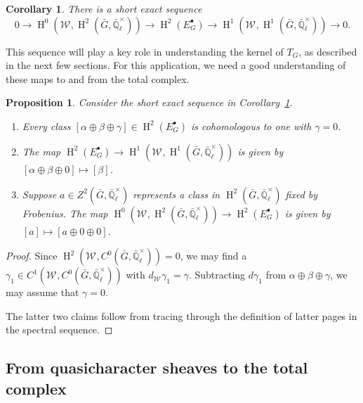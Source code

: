 \documentclass[10pt]{amsart}
\theoremstyle{plain}
\newtheorem{proposition}[theorem]{Proposition}
\newtheorem{corollary}[theorem]{Corollary}
\theoremstyle{definition}
\theoremstyle{remark}
\newcommand{\EE}{\mathbb{\bar Q}_\ell}
\newcommand{\EEx}{\EE^\times}
\newcommand{\Weil}[1]{\mathcal{W}_{#1}}
\DeclareMathOperator{\Hh}{H}
\newcommand{\TrFrob}[1]{T_{#1}}
\begin{document}
\begin{corollary}\label{cor:spectral_ses}
There is a short exact sequence
 \[
    0 \to
    \Hh^0(\Weil{},\Hh^2({\bar G},\EEx)) \to
    \Hh^2(E^\bullet_G) \to
    \Hh^1(\Weil{},\Hh^1({\bar G},\EEx)) \to
    0.
 \]
\end{corollary}

This sequence will play a key role in understanding the kernel of $\TrFrob{G}$, as described in the next few sections.
For this application, we need a good understanding of these maps to and from the total complex.

\begin{proposition} \label{prop:ses_desc}
Consider the short exact sequence in Corollary~\ref{cor:spectral_ses}.
\begin{enumerate}
\item Every class $[\alpha\oplus\beta\oplus\gamma] \in \Hh^2(E^\bullet_G)$ is cohomologous to one with $\gamma=0$.
\item The map $\Hh^2(E^\bullet_G) \to \Hh^1(\Weil{},\Hh^1({\bar G},\EEx))$ is given by $[\alpha\oplus\beta\oplus 0] \mapsto [\beta]$.
\item Suppose $a \in Z^2({\bar G}, \EEx)$ represents a class in $\Hh^2({\bar G},\EEx)$ fixed by Frobenius.
The map $\Hh^0(\Weil{},\Hh^2({\bar G},\EEx)) \to \Hh^2(E^\bullet_G)$ is given by $[a] \mapsto [a \oplus 0 \oplus 0]$.
\end{enumerate}
\end{proposition}
\begin{proof}
Since $\Hh^2(\Weil{}, C^0({\bar G}, \EEx)) = 0$, we may find a $\gamma_1 \in C^1(\Weil{}, C^0({\bar G}, \EEx))$ with $d_{\Weil{}}\gamma_1 = \gamma$.
Subtracting $d \gamma_1$ from $\alpha\oplus\beta\oplus\gamma$, we may assume that $\gamma = 0$.

The latter two claims follow from tracing through the definition of latter pages in the spectral sequence.
\end{proof}

\subsection{From quasicharacter sheaves to the total complex}\label{ssec:S}
\end{document}
